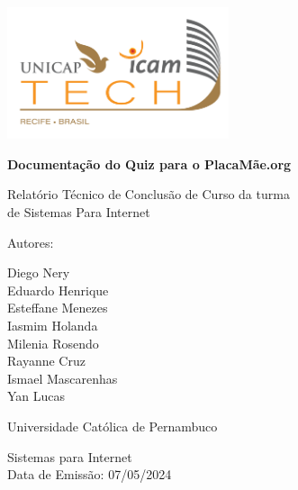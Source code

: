 \documentclass[12pt]{report}
\begin{document}
\newcommand{\titulo}{Documentação do Quiz para o PlacaMãe.org}
\newcommand{\nombreestudiante}{Diego Nery\\ Eduardo Henrique \\Esteffane Menezes\\ Iasmim Holanda \\Milenia Rosendo\\Rayanne Cruz \\ Ismael Mascarenhas\\ Yan Lucas \\}
\newcommand{\fecha}{\date{\today}}


\begin{titlepage}
	\centering
	\includegraphics[width=65mm]{Figuras/unicap.png}\par
	\vspace{1cm}
	{\LARGE\bfseries \titulo \par}
	\vfill
	{\large Relatório Técnico de Conclusão de Curso da turma\\de Sistemas Para Internet\par

	\vfill
	Autores:\par\vspace{2mm}
	\nombreestudiante\par
    \vfill
    Universidade Católica de Pernambuco\par
    Sistemas para Internet \\ Data de Emissão: 07/05/2024
 \par}
\end{titlepage}

\tableofcontents
\listoffigures







\printbibliography[heading=bibintoc, title={Referencias}]
\end{document}
